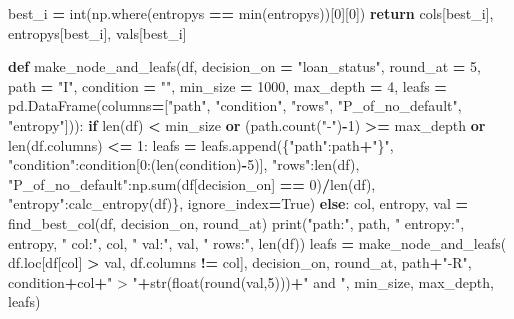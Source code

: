 \documentclass[
]{book}
\newenvironment{Shaded}{\begin{snugshade}}{\end{snugshade}}
\newcommand{\BuiltInTok}[1]{#1}
\newcommand{\ControlFlowTok}[1]{\textcolor[rgb]{0.13,0.29,0.53}{\textbf{#1}}}
\newcommand{\DecValTok}[1]{\textcolor[rgb]{0.00,0.00,0.81}{#1}}
\newcommand{\KeywordTok}[1]{\textcolor[rgb]{0.13,0.29,0.53}{\textbf{#1}}}
\newcommand{\NormalTok}[1]{#1}
\newcommand{\OperatorTok}[1]{\textcolor[rgb]{0.81,0.36,0.00}{\textbf{#1}}}
\newcommand{\StringTok}[1]{\textcolor[rgb]{0.31,0.60,0.02}{#1}}
\newcommand{\VariableTok}[1]{\textcolor[rgb]{0.00,0.00,0.00}{#1}}
\begin{document}
\begin{Shaded}
\begin{Highlighting}[]
\NormalTok{  best\_i }\OperatorTok{=} \BuiltInTok{int}\NormalTok{(np.where(entropys }\OperatorTok{==} \BuiltInTok{min}\NormalTok{(entropys))[}\DecValTok{0}\NormalTok{][}\DecValTok{0}\NormalTok{])}
  \ControlFlowTok{return}\NormalTok{ cols[best\_i], entropys[best\_i], vals[best\_i]}




\KeywordTok{def}\NormalTok{ make\_node\_and\_leafs(df, decision\_on }\OperatorTok{=} \StringTok{"loan\_status"}\NormalTok{, round\_at }\OperatorTok{=} \DecValTok{5}\NormalTok{, path }\OperatorTok{=} \StringTok{"I"}\NormalTok{, condition }\OperatorTok{=} \StringTok{""}\NormalTok{, min\_size }\OperatorTok{=} \DecValTok{1000}\NormalTok{, max\_depth }\OperatorTok{=} \DecValTok{4}\NormalTok{, leafs }\OperatorTok{=}\NormalTok{ pd.DataFrame(columns}\OperatorTok{=}\NormalTok{[}\StringTok{"path"}\NormalTok{, }\StringTok{"condition"}\NormalTok{, }\StringTok{"rows"}\NormalTok{, }\StringTok{"P\_of\_no\_default"}\NormalTok{, }\StringTok{"entropy"}\NormalTok{])):}
  \ControlFlowTok{if} \BuiltInTok{len}\NormalTok{(df) }\OperatorTok{\textless{}}\NormalTok{ min\_size }\KeywordTok{or}\NormalTok{ (path.count(}\StringTok{"{-}"}\NormalTok{)}\OperatorTok{{-}}\DecValTok{1}\NormalTok{) }\OperatorTok{\textgreater{}=}\NormalTok{ max\_depth }\KeywordTok{or} \BuiltInTok{len}\NormalTok{(df.columns) }\OperatorTok{\textless{}=} \DecValTok{1}\NormalTok{:}
\NormalTok{    leafs }\OperatorTok{=}\NormalTok{ leafs.append(\{}\StringTok{"path"}\NormalTok{:path}\OperatorTok{+}\StringTok{"\}"}\NormalTok{, }\StringTok{"condition"}\NormalTok{:condition[}\DecValTok{0}\NormalTok{:(}\BuiltInTok{len}\NormalTok{(condition)}\OperatorTok{{-}}\DecValTok{5}\NormalTok{)], }\StringTok{"rows"}\NormalTok{:}\BuiltInTok{len}\NormalTok{(df), }\StringTok{"P\_of\_no\_default"}\NormalTok{:np.}\BuiltInTok{sum}\NormalTok{(df[decision\_on] }\OperatorTok{==} \DecValTok{0}\NormalTok{)}\OperatorTok{/}\BuiltInTok{len}\NormalTok{(df), }\StringTok{"entropy"}\NormalTok{:calc\_entropy(df)\}, ignore\_index}\OperatorTok{=}\VariableTok{True}\NormalTok{)}
  \ControlFlowTok{else}\NormalTok{:}
\NormalTok{    col, entropy, val }\OperatorTok{=}\NormalTok{ find\_best\_col(df, decision\_on, round\_at)}
    \BuiltInTok{print}\NormalTok{(}\StringTok{"path:"}\NormalTok{, path, }\StringTok{"   entropy:"}\NormalTok{, entropy, }\StringTok{"  col:"}\NormalTok{, col, }\StringTok{"   val:"}\NormalTok{, val, }\StringTok{"  rows:"}\NormalTok{, }\BuiltInTok{len}\NormalTok{(df))}
\NormalTok{    leafs }\OperatorTok{=}\NormalTok{ make\_node\_and\_leafs( df.loc[df[col] }\OperatorTok{\textgreater{}}\NormalTok{ val, df.columns }\OperatorTok{!=}\NormalTok{ col], decision\_on, round\_at, path}\OperatorTok{+}\StringTok{"{-}R"}\NormalTok{, condition}\OperatorTok{+}\NormalTok{col}\OperatorTok{+}\StringTok{" \textgreater{} "}\OperatorTok{+}\BuiltInTok{str}\NormalTok{(}\BuiltInTok{float}\NormalTok{(}\BuiltInTok{round}\NormalTok{(val,}\DecValTok{5}\NormalTok{)))}\OperatorTok{+}\StringTok{" and "}\NormalTok{, min\_size, max\_depth, leafs)}

\end{Highlighting}
\end{Shaded}
\end{document}

